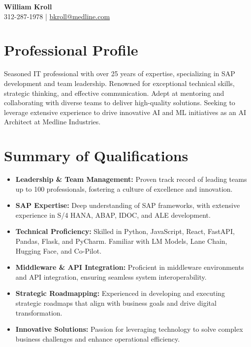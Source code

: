\documentclass[a4paper,10pt]{article}
\begin{document}
\begin{center}
    \textbf{\huge William Kroll} \\
    312-287-1978 | \href{mailto:bkroll@medline.com}{bkroll@medline.com}
\end{center}

\section*{Professional Profile}
Seasoned IT professional with over 25 years of expertise, specializing in SAP development and team leadership. Renowned for exceptional technical skills, strategic thinking, and effective communication. Adept at mentoring and collaborating with diverse teams to deliver high-quality solutions. Seeking to leverage extensive experience to drive innovative AI and ML initiatives as an AI Architect at Medline Industries.

\section*{Summary of Qualifications}
\begin{itemize}[leftmargin=2em]
    \item \textbf{Leadership \& Team Management:} Proven track record of leading teams up to 100 professionals, fostering a culture of excellence and innovation.
    \item \textbf{SAP Expertise:} Deep understanding of SAP frameworks, with extensive experience in S/4 HANA, ABAP, IDOC, and ALE development.
    \item \textbf{Technical Proficiency:} Skilled in Python, JavaScript, React, FastAPI, Pandas, Flask, and PyCharm. Familiar with LM Models, Lane Chain, Hugging Face, and Co-Pilot.
    \item \textbf{Middleware \& API Integration:} Proficient in middleware environments and API integration, ensuring seamless system interoperability.
    \item \textbf{Strategic Roadmapping:} Experienced in developing and executing strategic roadmaps that align with business goals and drive digital transformation.
    \item \textbf{Innovative Solutions:} Passion for leveraging technology to solve complex business challenges and enhance operational efficiency.
\end{itemize}
\end{document}
